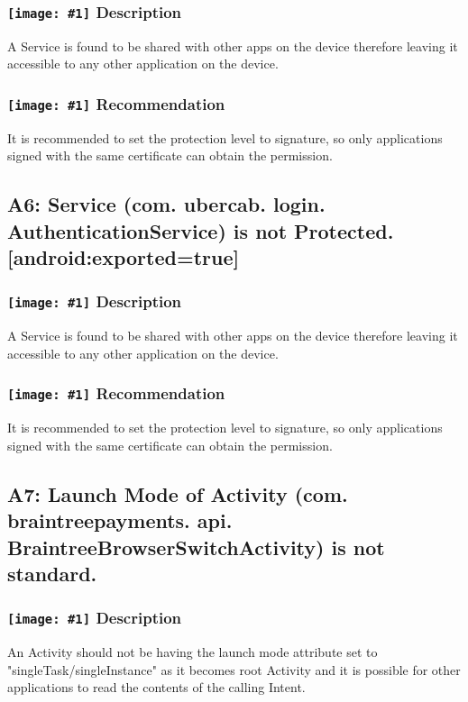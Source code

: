 \documentclass[12p]{article}
\newcommand{\icon}[1]{\texttt{[image: \#1]}}
\begin{document}
\subsubsection*{\protect\icon{/home/miki/Documents/GITHUB/AndroidPermissions/python/vulns/report_icons/basic_sheet.png} Description}
A Service is found to be shared with other apps on the device therefore leaving it accessible to any other application on the device.
\subsubsection*{\protect\icon{/home/miki/Documents/GITHUB/AndroidPermissions/python/vulns/report_icons/basic_todo.png} Recommendation}
It is recommended to set the protection level to signature, so only applications signed with the same certificate can obtain the permission.
\subsection{A6: Service (com. ubercab. login. AuthenticationService) is not Protected. [android:exported=true]}
\subsubsection*{\protect\icon{/home/miki/Documents/GITHUB/AndroidPermissions/python/vulns/report_icons/basic_sheet.png} Description}
A Service is found to be shared with other apps on the device therefore leaving it accessible to any other application on the device.
\subsubsection*{\protect\icon{/home/miki/Documents/GITHUB/AndroidPermissions/python/vulns/report_icons/basic_todo.png} Recommendation}
It is recommended to set the protection level to signature, so only applications signed with the same certificate can obtain the permission.
\subsection{A7: Launch Mode of Activity (com. braintreepayments. api. BraintreeBrowserSwitchActivity) is not standard.}
\subsubsection*{\protect\icon{/home/miki/Documents/GITHUB/AndroidPermissions/python/vulns/report_icons/basic_sheet.png} Description}
An Activity should not be having the launch mode attribute set to "singleTask/singleInstance" as it becomes root Activity and it is possible for other applications to read the contents of the calling Intent.
\end{document}
